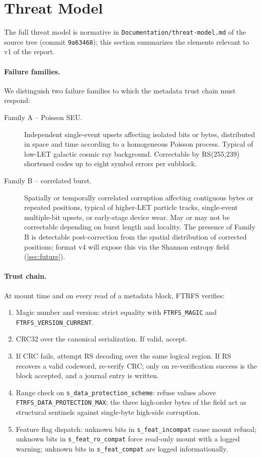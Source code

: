 \section{Threat Model}\label{sec:threat}

The full threat model is normative in
\texttt{Documentation/threat-model.md} of the source tree (commit
\texttt{9a63468}); this section summarizes the elements relevant to
v1 of the report.

\paragraph{Failure families.}
We distinguish two failure families to which the metadata trust
chain must respond:
\begin{description}
\item[Family A -- Poisson SEU.] Independent single-event upsets
  affecting isolated bits or bytes, distributed in space and time
  according to a homogeneous Poisson process. Typical of low-LET
  galactic cosmic ray background. Correctable by RS(255,239)
  shortened codes up to eight symbol errors per subblock.
\item[Family B -- correlated burst.] Spatially or temporally
  correlated corruption affecting contiguous bytes or repeated
  positions, typical of higher-LET particle tracks, single-event
  multiple-bit upsets, or early-stage device wear. May or may not
  be correctable depending on burst length and locality. The
  presence of Family B is detectable post-correction from the
  spatial distribution of corrected positions; format v4 will
  expose this via the Shannon entropy field
  (\cref{sec:future}).
\end{description}

\paragraph{Trust chain.}
At mount time and on every read of a metadata block, FTRFS verifies:
\begin{enumerate}
\item Magic number and version: strict equality with
  \texttt{FTRFS\_MAGIC} and \texttt{FTRFS\_VERSION\_CURRENT}.
\item CRC32 over the canonical serialization. If valid, accept.
\item If CRC fails, attempt RS decoding over the same logical
  region. If RS recovers a valid codeword, re-verify CRC; only on
  re-verification success is the block accepted, and a journal
  entry is written.
\item Range check on \texttt{s\_data\_protection\_scheme}: refuse
  values above \texttt{FTRFS\_DATA\_PROTECTION\_MAX}; the three
  high-order bytes of the field act as structural sentinels against
  single-byte high-side corruption.
\item Feature flag dispatch: unknown bits in
  \texttt{s\_feat\_incompat} cause mount refusal; unknown bits in
  \texttt{s\_feat\_ro\_compat} force read-only mount with a logged
  warning; unknown bits in \texttt{s\_feat\_compat} are logged
  informationally.
\end{enumerate}

